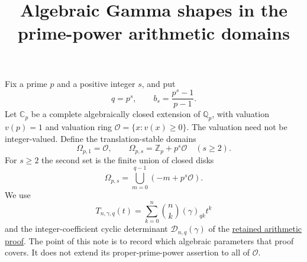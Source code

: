 \documentclass[11pt]{article}
\title{Algebraic Gamma shapes in the prime-power arithmetic domains}
\author{}\date{}
\newcommand{\Cp}{\mathbb C_p}
\newcommand{\Zp}{\mathbb Z_p}
\newcommand{\OO}{\mathcal O}
\begin{document}
\maketitle

Fix a prime $p$ and a positive integer $s$, and put
\[
 q=p^s,\qquad b_s=\frac{p^s-1}{p-1}.
\]
Let $\Cp$ be a complete algebraically closed extension of $\mathbb Q_p$,
with valuation $v(p)=1$ and valuation ring $\OO=\{x:v(x)\ge0\}$.
The valuation need not be integer-valued.
Define the translation-stable domains
\[
 \Omega_{p,1}=\OO,\qquad
 \Omega_{p,s}=\Zp+p^s\OO\quad(s\ge2).
 \tag{1}
\]
For $s\ge2$ the second set is the finite union of closed disks
\[
 \Omega_{p,s}=\bigcup_{m=0}^{q-1}(-m+p^s\OO).
 \tag{2}
\]
We use
\[
 T_{n,\gamma,q}(t)=\sum_{k=0}^n\binom nk(\gamma)_{qk}t^k
\]
and the integer-coefficient cyclic determinant
$\mathcal D_{n,q}(\gamma)$ of the
\href{ARITHMETIC_FRONTIER_TERMINAL_ORDERS.tex}{retained arithmetic proof}.
The point of this note is to record which algebraic parameters that proof
covers. It does not extend its proper-prime-power assertion to all
of $\OO$.
\end{document}
